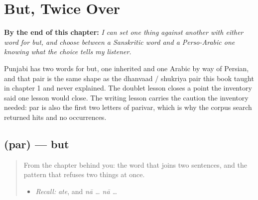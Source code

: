 
\chapter{But, Twice Over}
\label{ch:pa-but-twice-over}

\begin{chapteropening}
\textbf{By the end of this chapter:} \emph{I can set one thing against another with either word for but, and choose between a Sanskritic word and a Perso-Arabic one knowing what the choice tells my listener.}

Punjabi has two words for but, one inherited and one Arabic by way of Persian, and that pair is the same shape as the dhanvaad / shukriya pair this book taught in chapter 1 and never explained. The doublet lesson closes a point the inventory said one lesson would close. The writing lesson carries the caution the inventory needed: par is also the first two letters of parivar, which is why the corpus search returned hits and no occurrences.
\end{chapteropening}

\section[\texorpdfstring{\pa{ਪਰ} (par)}{ਪਰ (par)}]{ (par) — but}

\label{lesson:PA-C39-par}



\begin{quote}
From the chapter behind you: the word that joins two sentences, and the pattern that refuses two things at once.

\begin{itemize}
\raggedright
  \item \emph{Recall:} \emph{ate}, and \emph{nā … nā …}
\end{itemize}
\end{quote}

